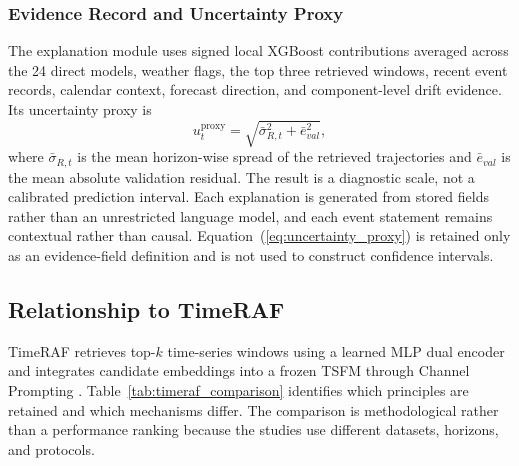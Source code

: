 \subsubsection{Evidence Record and Uncertainty Proxy}
The explanation module uses signed local XGBoost contributions averaged across
the 24 direct models, weather flags, the top three retrieved windows, recent
event records, calendar context, forecast direction, and component-level drift
evidence. Its uncertainty proxy is
\begin{equation}
u_t^{\mathrm{proxy}}=
\sqrt{\bar{\sigma}_{R,t}^{2}+\bar{e}_{val}^{2}},
\label{eq:uncertainty_proxy}
\end{equation}
where $\bar{\sigma}_{R,t}$ is the mean horizon-wise spread of the retrieved
trajectories and $\bar{e}_{val}$ is the mean absolute validation residual. The
result is a diagnostic scale, not a calibrated prediction interval. Each
explanation is generated from stored fields rather than an unrestricted
language model, and each event statement remains contextual rather than causal.
Equation~(\ref{eq:uncertainty_proxy}) is retained only as an evidence-field
definition and is not used to construct confidence intervals.

\subsection{Relationship to TimeRAF}
TimeRAF retrieves top-$k$ time-series windows using a learned MLP dual encoder
and integrates candidate embeddings into a frozen TSFM through Channel
Prompting \cite{zhang2025timeraf}. Table~\ref{tab:timeraf_comparison} identifies
which principles are retained and which mechanisms differ. The comparison is
methodological rather than a performance ranking because the studies use
different datasets, horizons, and protocols.

